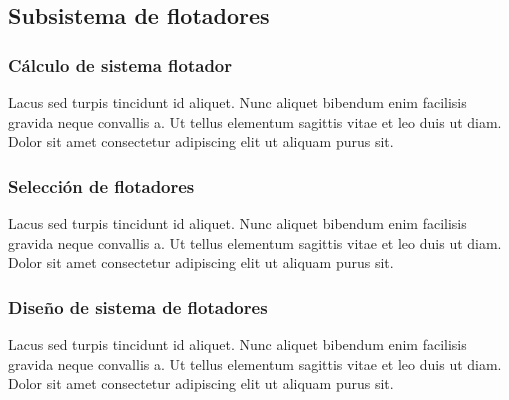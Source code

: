 \subsection{Subsistema de flotadores}

\subsubsection{Cálculo de sistema flotador}

Lacus sed turpis tincidunt id aliquet. Nunc aliquet bibendum enim facilisis gravida neque convallis a. Ut tellus elementum sagittis vitae et leo duis ut diam. Dolor sit amet consectetur adipiscing elit ut aliquam purus sit. 

\subsubsection{Selección de flotadores}

Lacus sed turpis tincidunt id aliquet. Nunc aliquet bibendum enim facilisis gravida neque convallis a. Ut tellus elementum sagittis vitae et leo duis ut diam. Dolor sit amet consectetur adipiscing elit ut aliquam purus sit. 

\subsubsection{Diseño de sistema de flotadores}

Lacus sed turpis tincidunt id aliquet. Nunc aliquet bibendum enim facilisis gravida neque convallis a. Ut tellus elementum sagittis vitae et leo duis ut diam. Dolor sit amet consectetur adipiscing elit ut aliquam purus sit. 
